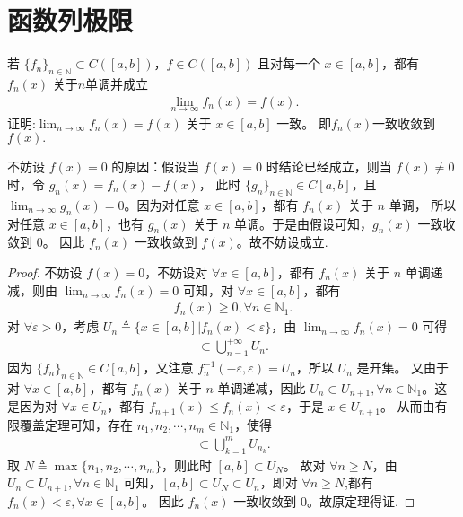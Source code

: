 \documentclass[../../main.tex]{subfiles}
\begin{document}
\section{函数列极限}

\begin{theorem}[Dini定理]\label{theorem:Dini定理(数分版本)}
若 \(\{f_n\}_{n\in\mathbb{N}}\subset C([a,b])\)，\(f\in C([a,b])\) 且对每一个 \(x\in [a,b]\)，都有 \(f_n(x)\) 关于$n$单调并成立
\begin{align*}
\lim_{n\rightarrow\infty}f_n(x)=f(x).
\end{align*}
证明:\(\lim_{n\rightarrow\infty}f_n(x)=f(x)\) 关于 \(x\in [a,b]\) 一致。 即$f_n(x)$一致收敛到$f(x).$
\end{theorem}
\begin{remark}
不妨设 \(f(x) = 0\) 的原因：假设当 \(f(x) = 0\) 时结论已经成立，则当 \(f(x)\ne 0\) 时，令 \(g_n(x)=f_n(x)-f(x)\)，
此时 \(\{g_n\}_{n\in \mathbb{N}}\in C[a,b]\)，且 \(\lim_{n\rightarrow \infty}g_n(x)=0\)。因为对任意 \(x\in [a,b]\)，都有 \(f_n(x)\) 关于 \(n\) 单调，
所以对任意 \(x\in [a,b]\)，也有 \(g_n(x)\) 关于 \(n\) 单调。于是由假设可知，\(g_n(x)\) 一致收敛到 \(0\)。
因此 \(f_n(x)\) 一致收敛到 \(f(x)\)。故不妨设成立.
\end{remark}
\begin{proof}
不妨设 \(f(x) = 0\)，不妨设对 \(\forall x\in [a,b]\)，都有 \(f_n(x)\) 关于 \(n\) 单调递减，则由 \(\lim_{n\rightarrow \infty}f_n(x)=0\) 可知，对 \(\forall x\in [a,b]\)，都有
\begin{align*}
f_n(x)\geqslant 0,\forall n\in \mathbb{N}_1.
\end{align*}
对 \(\forall \varepsilon>0\)，考虑 \(U_n\triangleq \{x\in [a,b]|f_n(x)<\varepsilon\}\)，由 \(\lim_{n\rightarrow \infty}f_n(x)=0\) 可得
\begin{align*}
[a,b]\subset \bigcup_{n = 1}^{+\infty}U_n.
\end{align*}
因为 \(\{f_n\}_{n\in \mathbb{N}}\in C[a,b]\)，又注意 \(f_{n}^{-1}(-\varepsilon,\varepsilon)=U_n\)，所以 \(U_n\) 是开集。
又由于对 \(\forall x\in [a,b]\)，都有 \(f_n(x)\) 关于 \(n\) 单调递减，因此 \(U_n\subset U_{n + 1},\forall n\in \mathbb{N}_1\)。这是因为对 \(\forall x\in U_n\)，都有 \(f_{n + 1}(x)\leqslant f_n(x)<\varepsilon\)，于是 \(x\in U_{n + 1}\)。
从而由有限覆盖定理可知，存在 \(n_1,n_2,\cdots,n_m\in \mathbb{N}_1\)，使得
\begin{align*}
[a,b]\subset \bigcup_{k = 1}^mU_{n_k}.
\end{align*}
取 \(N\triangleq \max\{n_1,n_2,\cdots,n_m\}\)，则此时 \([a,b]\subset U_N\)。
故对 \(\forall n\geqslant N\)，由 \(U_n\subset U_{n + 1},\forall n\in \mathbb{N}_1\) 可知，\([a,b]\subset U_N\subset U_n\)，即对 \(\forall n\geqslant N\),都有 \(f_n(x)<\varepsilon,\forall x\in [a,b]\)。
因此 \(f_n(x)\) 一致收敛到 $0$。故原定理得证. 

\end{proof}
\end{document}
